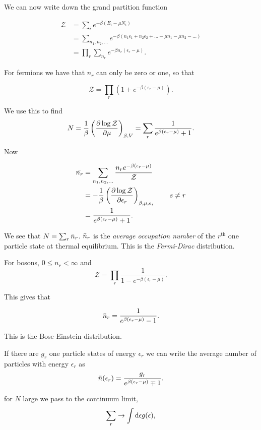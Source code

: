 \documentclass{notes}
\newcommand{\cZ}{\mathcal{Z}}
\newcommand{\pdf}[3]{\left(\pd{#1}{#2}\right)_{#3}}
\begin{document}
We can now write down the grand partition function

\begin{align*}
\cZ & = \sum_i e^{-\beta(E_i - \mu N_i)} \\
&= \sum_{n_1,n_2,\dots} e^{-\beta\left( n_1 \epsilon_1
+ n_2 \epsilon_2 + \dots - \mu n_1 - \mu n_2 - \dots \right)} \\
&= \prod_r \sum_{n_r} e^{-\beta n_r (\epsilon_r - \mu)}.
\end{align*}

For fermions we have that $n_r$ can only be zero or one, so that

\begin{equation}\label{eq:fermigpf}
\cZ = \prod_r \left( 1 + e^{-\beta(\epsilon_r - \mu)} \right).
\end{equation}

We use this to find
\[
N = \frac{1}{\beta} \pdf{\log \cZ}{\mu}{\beta,V}
= \sum_r \frac{1}{e^{\beta(\epsilon_r - \mu)} + 1}.
\]

Now

\begin{align*}
\Bar{n_r} &= \sum_{n_1,n_2,\dots} \frac{n_r e^{-\beta(\epsilon_r
- \mu)}}{\cZ} \\
&= - \frac{1}{\beta} \pdf{\log \cZ}{\epsilon_r}{\beta,\mu,\epsilon_s} \qquad
s \neq r \\
&= \frac{1}{e^{\beta(\epsilon_r - \mu)} + 1}.
\end{align*}

We see that $N = \sum_r \Bar{n}_r$.  $\Bar{n}_r$ is the \emph{average
  occupation number} of the $r^{\text{th}}$ one particle state at
thermal equilibrium.  This is the \emph{Fermi-Dirac} distribution.

For bosons, $0 \le n_r < \infty$ and
\[
\cZ = \prod_r \frac{1}{1 - e^{-\beta(\epsilon_r - \mu)}}.
\]

This gives that

\begin{equation}\label{eq:bosestat}
\Bar{n}_r = \frac{1}{e^{\beta(\epsilon_r - \mu)} - 1}.
\end{equation}

This is the Bose-Einstein distribution.

If there are $g_r$ one particle states of energy $\epsilon_r$
we can write the average number of particles with energy
$\epsilon_r$ as
\[
\Bar{n}(\epsilon_r) = \frac{g_r}{e^{\beta(\epsilon_r - \mu)} \mp 1}.
\]

for $N$ large we pass to the continuum limit,
\[
\sum_r \to \int \mathrm{d} \epsilon g(\epsilon),
\]
\end{document}
